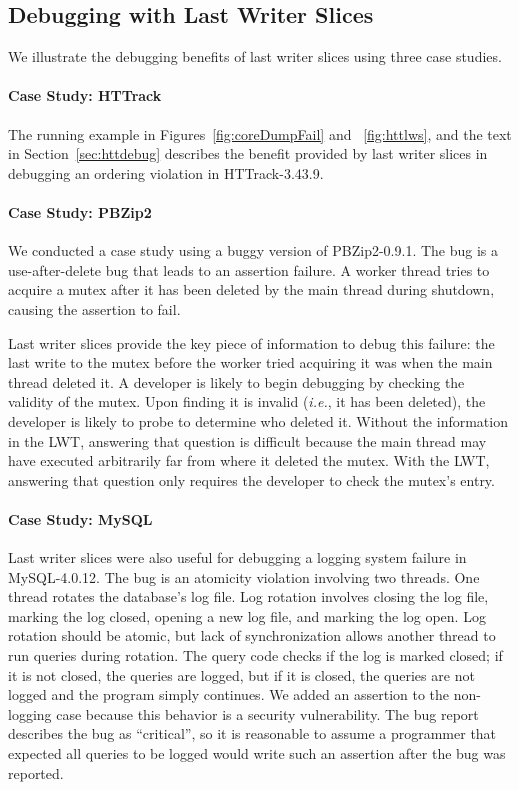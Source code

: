 \documentclass[preprint,9pt]{sigplanconf}
\newcommand{\lwt}{LWT\xspace}
\begin{document}
\subsection{Debugging with Last Writer Slices}
\label{sec:eval:debugging}
We illustrate the debugging benefits of last writer slices using three case
studies.    

\paragraph{Case Study: HTTrack}
The running example in Figures~\ref{fig:coreDumpFail} and ~\ref{fig:httlws},
and the text in Section~\ref{sec:httdebug} describes the benefit provided by
last writer slices in debugging an ordering violation in HTTrack-3.43.9.  

\paragraph{Case Study: PBZip2}
We conducted a case study using a buggy version of PBZip2-0.9.1.    The bug is
a use-after-delete bug that leads to an assertion failure.  A worker thread
tries to acquire a mutex after it has been deleted by the main thread during
shutdown, causing the assertion to fail.  

Last writer slices provide the key piece of information to debug this failure:
the last write to the mutex before the worker tried acquiring it was when the
main thread deleted it.  A developer is likely to begin debugging by checking
the validity of the mutex.  Upon finding it is invalid ({\em i.e.}, it has
been deleted), the developer is likely to probe to determine who deleted it.
Without the information in the \lwt, answering that question is difficult
because the main thread may have executed arbitrarily far from where it
deleted the mutex.  With the \lwt, answering that question only requires the
developer to check the mutex's entry.


\paragraph{Case Study: MySQL}
Last writer slices were also useful for debugging a logging system failure in
MySQL-4.0.12.  The bug is an atomicity violation involving two threads.  One
thread rotates the database's log file.  Log rotation involves closing the log
file, marking the log closed, opening a new log file, and marking the log open.
Log rotation should be atomic, but lack of synchronization allows another
thread to run queries during rotation.  The query code checks if the log is
marked closed; if it is not closed, the queries are logged, but if it is
closed, the queries are not logged and the program simply continues.  We added
an assertion to the non-logging case because this behavior is a security
vulnerability.  The bug report describes the bug as ``critical'', so it is
reasonable to assume a programmer that expected all queries to be logged would
write such an assertion after the bug was reported.
\end{document}
